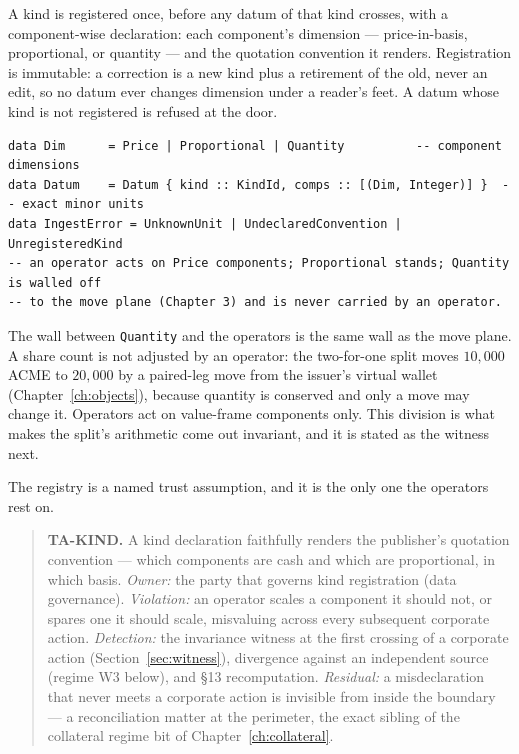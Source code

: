A kind is registered once, before any datum of that kind crosses, with a component-wise
declaration: each component's dimension --- price-in-basis, proportional, or quantity ---
and the quotation convention it renders. Registration is immutable: a correction is a new
kind plus a retirement of the old, never an edit, so no datum ever changes dimension under
a reader's feet. A datum whose kind is not registered is refused at the door.

\begin{lstlisting}
data Dim      = Price | Proportional | Quantity          -- component dimensions
data Datum    = Datum { kind :: KindId, comps :: [(Dim, Integer)] }  -- exact minor units
data IngestError = UnknownUnit | UndeclaredConvention | UnregisteredKind
-- an operator acts on Price components; Proportional stands; Quantity is walled off
-- to the move plane (Chapter 3) and is never carried by an operator.
\end{lstlisting}

The wall between \texttt{Quantity} and the operators is the same wall as the move plane. A
share count is not adjusted by an operator: the two-for-one split moves $10{,}000$ ACME to
$20{,}000$ by a paired-leg move from the issuer's virtual wallet (Chapter~\ref{ch:objects}),
because quantity is conserved and only a move may change it. Operators act on value-frame
components only. This division is what makes the split's arithmetic come out invariant, and
it is stated as the witness next.

The registry is a named trust assumption, and it is the only one the operators rest on.

\begin{quote}
\textbf{TA-KIND.} A kind declaration faithfully renders the publisher's quotation
convention --- which components are cash and which are proportional, in which basis.
\emph{Owner:} the party that governs kind registration (data governance). \emph{Violation:}
an operator scales a component it should not, or spares one it should scale, misvaluing
across every subsequent corporate action. \emph{Detection:} the invariance witness at the
first crossing of a corporate action (Section~\ref{sec:witness}), divergence against an
independent source (regime W3 below), and \S 13 recomputation. \emph{Residual:} a
misdeclaration that never meets a corporate action is invisible from inside the boundary
--- a reconciliation matter at the perimeter, the exact sibling of the collateral regime
bit of Chapter~\ref{ch:collateral}.
\end{quote}

